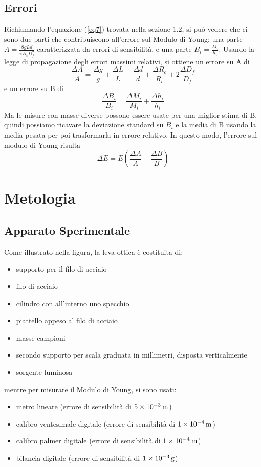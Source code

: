 \documentclass[a4paper]{article}
\begin{document}
\subsection{Errori}
Richiamando l'equazione (\ref{eq7}) trovata nella sezione 1.2, si può vedere che ci sono due parti che contribuiscono all'errore sul Modulo di Young; una parte $A=\frac{8gLd}{\pi R_c D^2_f}$ caratterizzata da errori di sensibilità, e una parte $B_i=\frac{M_i}{h_i}$. Usando la legge di propagazione degli errori massimi relativi, si ottiene un errore su A di
\begin{equation}
    \frac{\Delta A}{A} = \frac{\Delta g}{g} + \frac{\Delta L}{L} + \frac{\Delta d}{d} + \frac{\Delta R_c}{R_c} + 2\frac{\Delta D_f}{D_f}
\end{equation}
e un errore su B di
\begin{equation}
    \frac{\Delta B_i}{B_i} = \frac{\Delta M_i}{M_i} + \frac{\Delta h_i}{h_i}
\end{equation}
Ma le misure con masse diverse possono essere usate per una miglior stima di B, quindi possiamo ricavare la deviazione standard su $B_i$ e la media di B usando la media pesata per poi trasformarla in errore relativo. In questo modo, l'errore sul modulo di Young risulta 
\begin{equation}
    \Delta E = E (\frac{\Delta A}{A} + \frac{\Delta B}{B})
\end{equation}

\section{Metologia}
\subsection{Apparato Sperimentale}
Come illustrato nella figura, la leva ottica è costituita di:
\begin{itemize}
    \item supporto per il filo di acciaio
    \item filo di acciaio
    \item cilindro con all'interno uno specchio
    \item piattello appeso al filo di acciaio
    \item masse campioni
    \item secondo supporto per scala graduata in millimetri, disposta verticalmente
    \item sorgente luminosa
\end{itemize}
mentre per misurare il Modulo di Young, si sono usati:
\begin{itemize}
    \item metro lineare (errore di sensibilità di $\SI{5E-3}{m}$)
    \item calibro ventesimale digitale (errore di sensibilità di $\SI{1E-4}{m}$)
    \item calibro palmer digitale (errore di sensibilità di $\SI{1E-4}{m}$)
    \item bilancia digitale (errore di sensibilità di $\SI{1E-3}{g}$)
\end{itemize}
\end{document}
